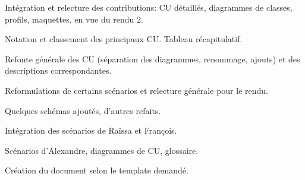 \bgroup\tfxx
{}

 Intégration et relecture des contributions: CU détaillés, diagrammes de classes, profils, maquettes, en vue du rendu 2.

Notation et classement des principaux CU. Tableau récapitulatif.

Refonte générale des CU (séparation des diagrammes, renommage, ajouts) et des descriptions correspondantes.

Reformulations de certains scénarios et relecture générale pour le rendu.

Quelques schémas ajoutés, d'autres refaits.

Intégration des scénarios de Raïssa et François.

Scénarios d'Alexandre, diagrammes de CU, glossaire.

Création du document selon le template demandé.
\par
\egroup
